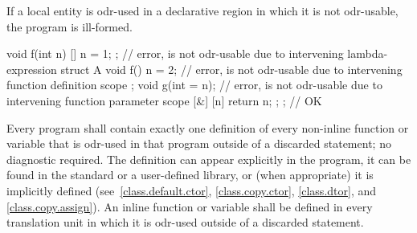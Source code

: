 If a local entity is odr-used
in a declarative region in which it is not odr-usable,
the program is ill-formed.
\begin{example}
\begin{codeblock}
void f(int n) {
  [] { n = 1; };                // error,  is not odr-usable due to intervening lambda-expression
  struct A {
    void f() { n = 2; }         // error,  is not odr-usable due to intervening function definition scope
  };
  void g(int = n);              // error,  is not odr-usable due to intervening function parameter scope
  [&] { [n]{ return n; }; };    // OK
}
\end{codeblock}
\end{example}

\pnum
Every program shall contain exactly one definition of every non-inline
function or variable that is odr-used in that program
outside of a discarded statement; no diagnostic required.
The definition can appear explicitly in the program, it can be found in
the standard or a user-defined library, or (when appropriate) it is
implicitly defined (see~\ref{class.default.ctor}, \ref{class.copy.ctor},
\ref{class.dtor}, and \ref{class.copy.assign}).
An inline function or variable shall be defined in every
translation unit in which it is odr-used outside of a discarded statement.

